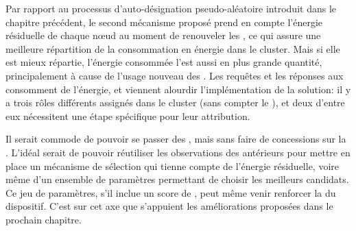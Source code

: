 Par rapport au processus d'auto-désignation pseudo-aléatoire introduit dans le chapitre précédent, le second mécanisme proposé prend en compte l'énergie résiduelle de chaque nœud au moment de renouveler les \cns, ce qui assure une meilleure répartition de la consommation en énergie dans le cluster.
Mais si elle est mieux répartie, l'énergie consommée l'est aussi en plus grande quantité, principalement à cause de l'usage nouveau des \vns.
Les requêtes et les réponses aux \cns consomment de l'énergie, et viennent alourdir l'implémentation de la solution: il y a trois rôles différents assignés dans le cluster (sans compter le \ch), et deux d'entre eux nécessitent une étape spécifique pour leur attribution.

Il serait commode de pouvoir se passer des \vns, mais sans faire de concessions sur la \secu.
L'idéal serait de pouvoir réutiliser les observations des \cns antérieurs pour mettre en place un mécanisme de sélection qui tienne compte de l'énergie résiduelle, voire même d'un ensemble de paramètres permettant de choisir les meilleurs candidats.
Ce jeu de paramètres, s'il inclue un score de , peut même venir renforcer la \secu du dispositif.
C'est sur cet axe que s'appuient les améliorations proposées dans le prochain chapitre.
